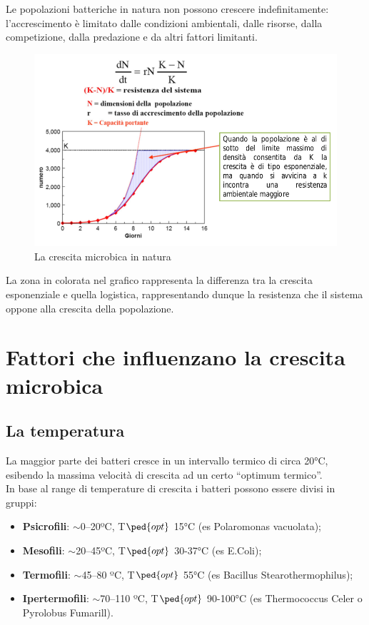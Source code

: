\documentclass[11pt]{book}
\begin{document}
Le popolazioni batteriche in natura non possono crescere indefinitamente: l’accrescimento è limitato dalle condizioni ambientali, dalle risorse, dalla competizione, dalla predazione e da altri fattori limitanti.

\begin{figure}[htp]
\centering
\includegraphics[scale=0.5]{img/Crescita in natura.png}
\caption{La crescita microbica in natura}
\label{}
\end{figure}

La zona in colorata nel grafico rappresenta la differenza tra la crescita esponenziale e quella logistica, rappresentando dunque la resistenza che il sistema oppone alla crescita della popolazione.


\section{Fattori che influenzano la crescita microbica}
\subsection{La temperatura}
La maggior parte dei batteri cresce in un intervallo termico di circa 20°C, esibendo la massima velocità di crescita ad un certo “optimum termico”.\\
In base al range di temperature di crescita i batteri possono essere divisi in gruppi:
\begin{itemize}
\item \textbf{Psicrofili}: $\sim$0–20ºC, T$\ped{opt}$ 15°C (es Polaromonas vacuolata);
\item \textbf{Mesofili}: $\sim$20–45ºC, T$\ped{opt}$ 30-37°C (es E.Coli);
\item \textbf{Termofili}: $\sim$45–80 ºC, T$\ped{opt}$ 55°C (es Bacillus Stearothermophilus);
\item \textbf{Ipertermofili}: $\sim$70–110 ºC, T$\ped{opt}$ 90-100°C (es Thermococcus Celer o Pyrolobus Fumarill).
\end{itemize}
\end{document}
